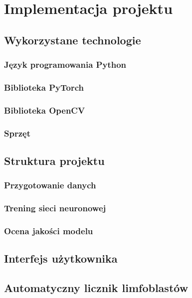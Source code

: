 \chapter{Implementacja projektu}

\section{Wykorzystane technologie}

\subsection{Język programowania Python}

\subsection{Biblioteka PyTorch}

\subsection{Biblioteka OpenCV}

\subsection{Sprzęt}

\section{Struktura projektu}

\subsection{Przygotowanie danych}

\subsection{Trening sieci neuronowej}

\subsection{Ocena jakości modelu}

\section{Interfejs użytkownika}

\section{Automatyczny licznik limfoblastów}


